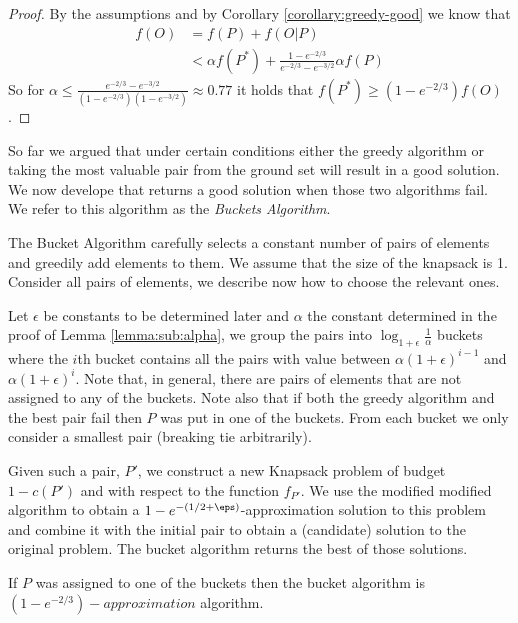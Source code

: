 \begin{proof}
	By the assumptions and by Corollary \ref{corollary:greedy-good} we know that 
	\begin{align}
		f(O)	& = f(P) + f(O|P) 
		\\ 		& < \alpha f(P^*) + \frac{1 - e^{-2/3}}{e^{-2/3} - e^{-3/2}} \alpha f(P)
	\end{align}
	So for $\alpha \leq \frac{e^{-2/3} - e^{-3/2}}{(1-e^{-2/3})(1-e^{-3/2})} \approx 0.77$ it holds that $f(P^*) \geq (1 - e^{-2/3})f(O)$.
\end{proof}

So far we argued that under certain conditions either the greedy algorithm or taking the most valuable pair from the ground set will result in a good solution. 
We now develope that returns a good solution when those two algorithms fail.
We refer to this algorithm as the \emph{Buckets Algorithm}.

The Bucket Algorithm carefully selects a constant number of pairs of elements and greedily
add elements to them.
We assume that the size of the knapsack is 1.
Consider all pairs of elements, we describe now how to choose the relevant ones.

Let $\epsilon$ be constants to be determined later and $\alpha$ the constant determined in the proof of Lemma \ref{lemma:sub:alpha},
we group the pairs into $\log_{1 + \epsilon}\frac{1}{\alpha}$ buckets where the $i$th bucket contains all the pairs with value
between $\alpha (1 + \epsilon)^{i - 1}$ and $\alpha (1 + \epsilon)^{i}$.
Note that, in general, there are pairs of elements that are not assigned to any of the buckets.
Note also that if both the greedy algorithm and the best pair fail then $P$ was put in one of the buckets.
From each bucket we only consider a smallest pair (breaking tie arbitrarily).

Given such a pair, $P'$, we construct a new Knapsack problem of budget $1 - c(P')$ and with respect to the function $f_{P'}$.
We use the modified modified algorithm to obtain a $1-e^{-(1/2 + \eps)}$-approximation
solution to this problem and combine it with the initial pair to obtain a (candidate)
solution to the original problem.
The bucket algorithm returns the best of those solutions.

\begin{lemma}
	If $P$ was assigned to one of the buckets then the bucket algorithm is $(1 - e^{-2/3})-approximation$ algorithm.
\end{lemma}

